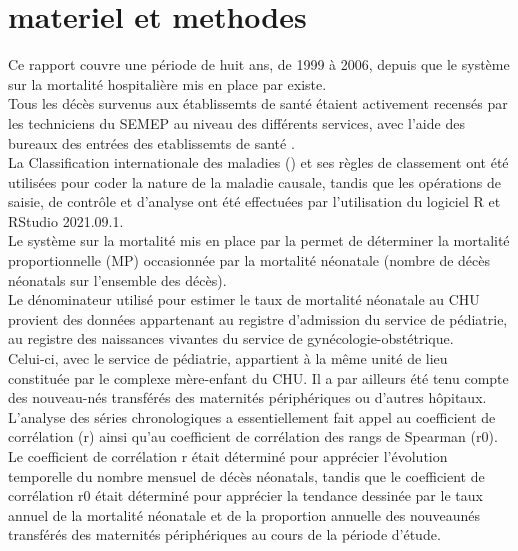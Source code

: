 \section{materiel et methodes}
\cite{ref1}
Ce rapport couvre une période de huit ans, de 1999 à 2006,
depuis que le système sur la mortalité hospitalière mis en
place par \dsp{\wil} existe.\\ 

Tous les décès survenus aux établissemts de santé
étaient activement recensés par les techniciens du SEMEP au
niveau des différents services, avec l’aide des bureaux des
entrées des etablissemts de santé .\\

La Classification internationale des maladies (\cim) et
ses règles de classement ont été utilisées pour coder la nature
de la maladie causale, tandis que les opérations de saisie, de
contrôle et d’analyse ont été effectuées par l’utilisation du
logiciel R  et RStudio 2021.09.1.\\

Le système sur la mortalité mis en place par la
\dsp{\wil} permet de déterminer la mortalité proportionnelle
(MP) occasionnée par la mortalité néonatale (nombre de
décès néonatals sur l’ensemble des décès).\\
Le dénominateur
utilisé pour estimer le taux de mortalité néonatale au CHU
provient des données appartenant au registre d’admission du
service de pédiatrie, au registre des naissances vivantes du
service de gynécologie-obstétrique. \\

Celui-ci, avec le service
de pédiatrie, appartient à la même unité de lieu constituée par
le complexe mère-enfant du CHU. Il a par ailleurs été tenu
compte des nouveau-nés transférés des maternités périphériques
ou d’autres hôpitaux.\\

L’analyse des séries chronologiques a essentiellement fait
appel au coefficient de corrélation (r) ainsi qu’au coefficient
de corrélation des rangs de Spearman (r0). \\ 

Le coefficient de
corrélation r était déterminé pour apprécier l’évolution
temporelle du nombre mensuel de décès néonatals, tandis
que le coefficient de corrélation r0 était déterminé pour
apprécier la tendance dessinée par le taux annuel de la
mortalité néonatale et de la proportion annuelle des nouveaunés
transférés des maternités périphériques au cours de la
période d’étude.\\ 

